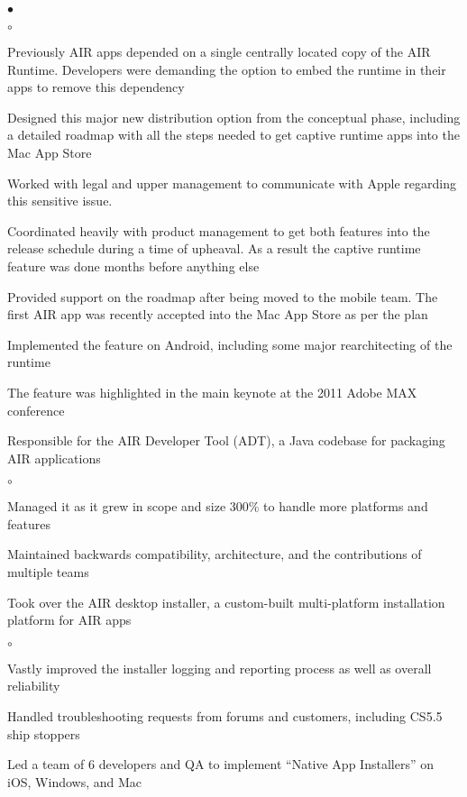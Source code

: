 \documentclass[ComputerScience]{vita}
\newenvironment{suber}[0]
{\begin{list}{$\bullet$}
	{\setlength{\topsep}{-0.4in}
		\setlength{\leftmargin}{0.25in}
		\setlength{\itemsep}{0.01in}}
}
{\end{list}\par}
\newenvironment{suberb}[0]
{\begin{list}{$\circ$}
	{\setlength{\topsep}{-0.4in}
		\setlength{\leftmargin}{0.25in}
		\setlength{\itemsep}{0.01in}}
}
{\end{list}\par}
\begin{document}
\begin{vita}
\begin{list}{}{\setlength{\leftmargin}{.25in}}
\begin{suber}
		\begin{suberb}
			\item Previously AIR apps depended on a single centrally located copy of the AIR Runtime. Developers were demanding the option to embed the runtime in their apps to remove this dependency
			\item Designed this major new distribution option from the conceptual phase, including a detailed roadmap with all the steps needed to get captive runtime apps into the Mac App Store 
			\item Worked with legal and upper management to communicate with Apple regarding this sensitive issue.
			\item Coordinated heavily with product management to get both features into the release schedule during a time of upheaval. As a result the captive runtime feature was done months before anything else
			\item Provided support on the roadmap after being moved to the mobile team. The first AIR app was recently accepted into the Mac App Store as per the plan
			\item Implemented the feature on Android, including some major rearchitecting of the runtime
			\item The feature was highlighted in the main keynote at the 2011 Adobe MAX conference
		\end{suberb}
	\item Responsible for the AIR Developer Tool (ADT), a Java codebase for packaging AIR applications
		\begin{suberb}
			\item Managed it as it grew in scope and size 300\% to handle more platforms and features 
			\item Maintained backwards compatibility, architecture, and the contributions of multiple teams
		\end{suberb}
	\item Took over the AIR desktop installer, a custom-built multi-platform installation platform for AIR apps
		\begin{suberb}
			\item Vastly improved the installer logging and reporting process as well as overall reliability
			\item Handled troubleshooting requests from forums and customers, including CS5.5 ship stoppers
		\end{suberb}
	\item Led a team of 6 developers and QA to implement ``Native App Installers'' on iOS, Windows, and Mac

\end{suber}
\end{list}
\end{vita}
\end{document}

